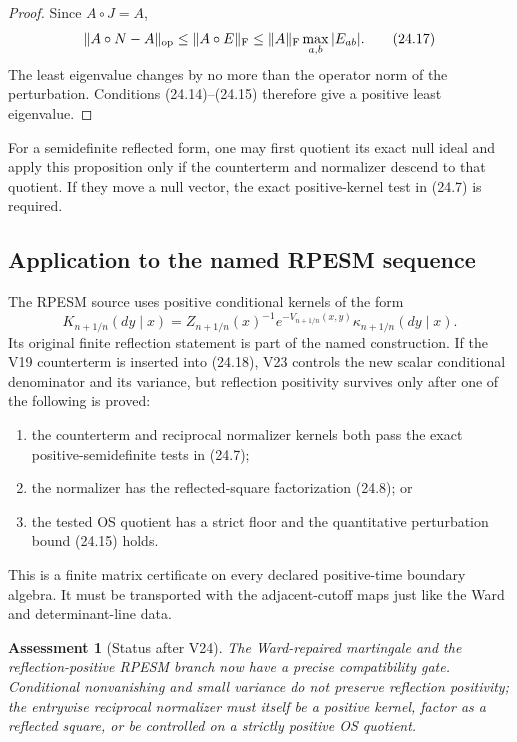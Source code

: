 \documentclass[11pt]{article}
\newtheorem{assessment}[theorem]{Assessment}
\theoremstyle{remark}
\begin{document}
\begin{proof}
Since \(A\circ J=A\),
\[
 \|A\circ N-A\|_{\rm op}
 \le\|A\circ E\|_{\rm F}
 \le\|A\|_{\rm F}\max_{a,b}|E_{ab}|.                       \tag{24.17}
\]
The least eigenvalue changes by no more than the operator norm of the
perturbation.  Conditions (24.14)--(24.15) therefore give a positive
least eigenvalue.
\end{proof}

For a semidefinite reflected form, one may first quotient its exact
null ideal and apply this proposition only if the counterterm and
normalizer descend to that quotient.  If they move a null vector, the
exact positive-kernel test in (24.7) is required.

\subsection{Application to the named RPESM sequence}

The RPESM source uses positive conditional kernels of the form
\[
 K_{n+1/n}(dy\mid x)
 =
 Z_{n+1/n}(x)^{-1}e^{-V_{n+1/n}(x,y)}
 \kappa_{n+1/n}(dy\mid x).                                 \tag{24.18}
\]
Its original finite reflection statement is part of the named
construction.  If the V19 counterterm is inserted into (24.18), V23
controls the new scalar conditional denominator and its variance,
but reflection positivity survives only after one of the following
is proved:

\begin{enumerate}
\item the counterterm and reciprocal normalizer kernels both pass the
      exact positive-semidefinite tests in (24.7);
\item the normalizer has the reflected-square factorization (24.8);
      or
\item the tested OS quotient has a strict floor and the quantitative
      perturbation bound (24.15) holds.
\end{enumerate}

This is a finite matrix certificate on every declared positive-time
boundary algebra.  It must be transported with the adjacent-cutoff
maps just like the Ward and determinant-line data.

\begin{assessment}[Status after V24]
\label{ass:v12v24-status}
The Ward-repaired martingale and the reflection-positive RPESM branch
now have a precise compatibility gate.  Conditional nonvanishing and
small variance do not preserve reflection positivity; the entrywise
reciprocal normalizer must itself be a positive kernel, factor as a
reflected square, or be controlled on a strictly positive OS
quotient.
\end{assessment}
\end{document}
